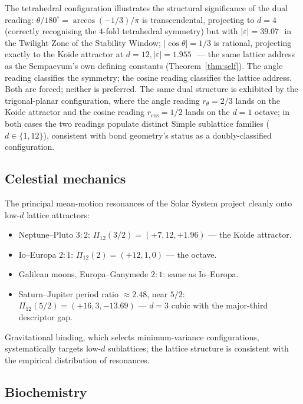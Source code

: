 \documentclass[11pt,a4paper]{article}
\theoremstyle{definition}
\theoremstyle{remark}
\newcommand{\eps}{\varepsilon}
\begin{document}
\noindent The tetrahedral configuration illustrates the structural significance of the dual reading: $\theta/180^{\circ} = \arccos(-1/3)/\pi$ is transcendental, projecting to $d=4$ (correctly recognising the $4$-fold tetrahedral symmetry) but with $|\eps|=39.07$\,\textcent\ in the Twilight Zone of the Stability Window; $|\cos\theta|=1/3$ is rational, projecting exactly to the Koide attractor at $d=12, |\eps|=1.955$\,\textcent\ --- the same lattice address as the Sempaevum's own defining constants (Theorem~\ref{thm:self}). The angle reading classifies the symmetry; the cosine reading classifies the lattice address. Both are forced; neither is preferred. The same dual structure is exhibited by the trigonal-planar configuration, where the angle reading $r_{\theta}=2/3$ lands on the Koide attractor and the cosine reading $r_{\cos}=1/2$ lands on the $d=1$ octave; in both cases the two readings populate distinct Simple sublattice families ($d \in \{1,12\}$), consistent with bond geometry's status as a doubly-classified configuration.

\subsection{Celestial mechanics}\label{subsec:celestial}

The principal mean-motion resonances of the Solar System project cleanly onto low-$d$ lattice attractors:
\begin{itemize}[leftmargin=*]
\item Neptune--Pluto $3{:}2$: $\Pi_{12}(3/2) = (+7, 12, +1.96)$ --- the Koide attractor.
\item Io--Europa $2{:}1$: $\Pi_{12}(2) = (+12, 1, 0)$ --- the octave.
\item Galilean moons, Europa--Ganymede $2{:}1$: same as Io--Europa.
\item Saturn--Jupiter period ratio $\approx 2.48$, near $5/2$: $\Pi_{12}(5/2) = (+16, 3, -13.69)$ --- $d=3$ cubic with the major-third descriptor gap.
\end{itemize}

Gravitational binding, which selects minimum-variance configurations, systematically targets low-$d$ sublattices; the lattice structure is consistent with the empirical distribution of resonances.

\subsection{Biochemistry}\label{subsec:biology}
\end{document}
